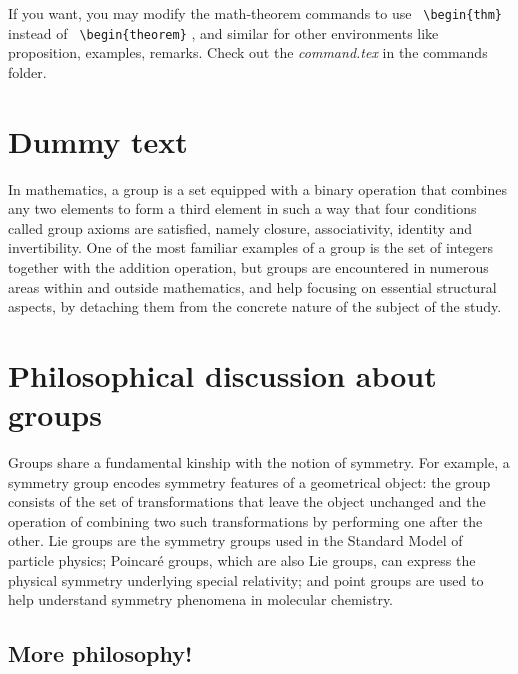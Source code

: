   \begin{remark}
    \label{rem:renaming-env}
    If you want, you may modify the math-theorem commands to use
    \verb+ \begin{thm}+ instead of
    \verb+ \begin{theorem}+ , and similar
    for other environments like proposition, examples, remarks. Check
    out the \emph{command.tex} in the commands folder.
  \end{remark}
  
\section{Dummy text}

In mathematics, a group is a set equipped with a binary operation that combines any two elements to form a third element in such a way that four conditions called group axioms are satisfied, namely closure, associativity, identity and invertibility. One of the most familiar examples of a group is the set of integers together with the addition operation, but groups are encountered in numerous areas within and outside mathematics, and help focusing on essential structural aspects, by detaching them from the concrete nature of the subject of the study.

\section{Philosophical discussion about groups}
\label{sec:grp-philo}

Groups share a fundamental kinship with the notion of symmetry. For example, a symmetry group encodes symmetry features of a geometrical object: the group consists of the set of transformations that leave the object unchanged and the operation of combining two such transformations by performing one after the other. Lie groups are the symmetry groups used in the Standard Model of particle physics; Poincaré groups, which are also Lie groups, can express the physical symmetry underlying special relativity; and point groups are used to help understand symmetry phenomena in molecular chemistry.

\subsection{More philosophy!}
\label{subsec:grp-philo}

